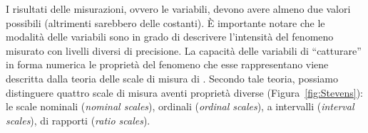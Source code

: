 
I risultati delle misurazioni, ovvero le variabili, devono avere almeno due valori possibili (altrimenti sarebbero delle costanti).
È importante notare che le modalità delle variabili sono in grado di descrivere l'intensità del fenomeno misurato con livelli diversi di precisione. 
La capacità delle variabili di ``catturare'' in forma numerica le proprietà del fenomeno che esse rappresentano viene descritta dalla teoria delle scale di misura di \citet{stevens46}. 
Secondo tale teoria, possiamo distinguere quattro scale di misura aventi proprietà diverse (Figura~\ref{fig:Stevens}): le scale nominali (\emph{nominal scales}), ordinali (\emph{ordinal scales}), a intervalli (\emph{interval scales}), di rapporti (\emph{ratio scales}).

